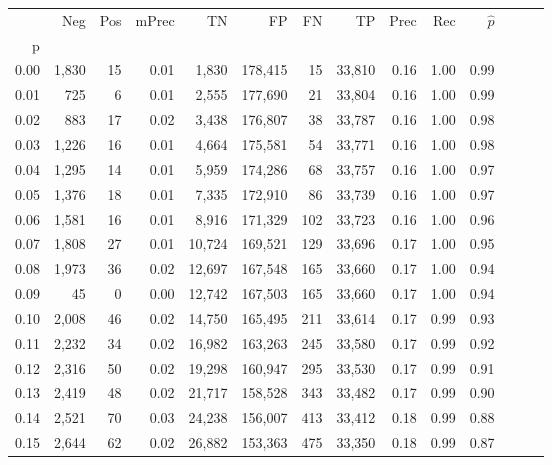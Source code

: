 \begin{tabular}{rrrrrrrrrrrrrr}
\toprule
{} &    Neg &  Pos & mPrec &       TN &       FP &      FN &      TP &  Prec &   Rec & $\hat{p}$ \\
p    &        &      &       &          &          &         &         &       &       &           \\
\midrule
0.00 &  1,830 &   15 &  0.01 &    1,830 &  178,415 &      15 &  33,810 &  0.16 &  1.00 &      0.99 \\
0.01 &    725 &    6 &  0.01 &    2,555 &  177,690 &      21 &  33,804 &  0.16 &  1.00 &      0.99 \\
0.02 &    883 &   17 &  0.02 &    3,438 &  176,807 &      38 &  33,787 &  0.16 &  1.00 &      0.98 \\
0.03 &  1,226 &   16 &  0.01 &    4,664 &  175,581 &      54 &  33,771 &  0.16 &  1.00 &      0.98 \\
0.04 &  1,295 &   14 &  0.01 &    5,959 &  174,286 &      68 &  33,757 &  0.16 &  1.00 &      0.97 \\
0.05 &  1,376 &   18 &  0.01 &    7,335 &  172,910 &      86 &  33,739 &  0.16 &  1.00 &      0.97 \\
0.06 &  1,581 &   16 &  0.01 &    8,916 &  171,329 &     102 &  33,723 &  0.16 &  1.00 &      0.96 \\
0.07 &  1,808 &   27 &  0.01 &   10,724 &  169,521 &     129 &  33,696 &  0.17 &  1.00 &      0.95 \\
0.08 &  1,973 &   36 &  0.02 &   12,697 &  167,548 &     165 &  33,660 &  0.17 &  1.00 &      0.94 \\
0.09 &     45 &    0 &  0.00 &   12,742 &  167,503 &     165 &  33,660 &  0.17 &  1.00 &      0.94 \\
0.10 &  2,008 &   46 &  0.02 &   14,750 &  165,495 &     211 &  33,614 &  0.17 &  0.99 &      0.93 \\
0.11 &  2,232 &   34 &  0.02 &   16,982 &  163,263 &     245 &  33,580 &  0.17 &  0.99 &      0.92 \\
0.12 &  2,316 &   50 &  0.02 &   19,298 &  160,947 &     295 &  33,530 &  0.17 &  0.99 &      0.91 \\
0.13 &  2,419 &   48 &  0.02 &   21,717 &  158,528 &     343 &  33,482 &  0.17 &  0.99 &      0.90 \\
0.14 &  2,521 &   70 &  0.03 &   24,238 &  156,007 &     413 &  33,412 &  0.18 &  0.99 &      0.88 \\
0.15 &  2,644 &   62 &  0.02 &   26,882 &  153,363 &     475 &  33,350 &  0.18 &  0.99 &      0.87 \\

\end{tabular}
